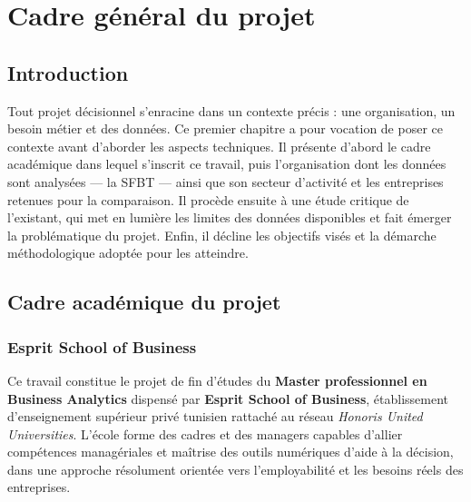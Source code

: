 \chapter{Cadre général du projet}
\label{chapter:contexte}


\section*{Introduction}
\par Tout projet décisionnel s'enracine dans un contexte précis : une
organisation, un besoin métier et des données. Ce premier chapitre a pour
vocation de poser ce contexte avant d'aborder les aspects techniques. Il présente
d'abord le cadre académique dans lequel s'inscrit ce travail, puis l'organisation
dont les données sont analysées — la \ac{SFBT} — ainsi que son secteur d'activité
et les entreprises retenues pour la comparaison. Il procède ensuite à une étude
critique de l'existant, qui met en lumière les limites des données disponibles et
fait émerger la problématique du projet. Enfin, il décline les objectifs visés et
la démarche méthodologique adoptée pour les atteindre.

\section{Cadre académique du projet}
\label{sec:cadre}

\subsection{Esprit School of Business}
\par Ce travail constitue le projet de fin d'études du \textbf{Master
professionnel en Business Analytics} dispensé par \textbf{Esprit School of
Business}, établissement d'enseignement supérieur privé tunisien rattaché au
réseau \textit{Honoris United Universities}. L'école forme des cadres et des
managers capables d'allier compétences managériales et maîtrise des outils
numériques d'aide à la décision, dans une approche résolument orientée vers
l'employabilité et les besoins réels des entreprises.

